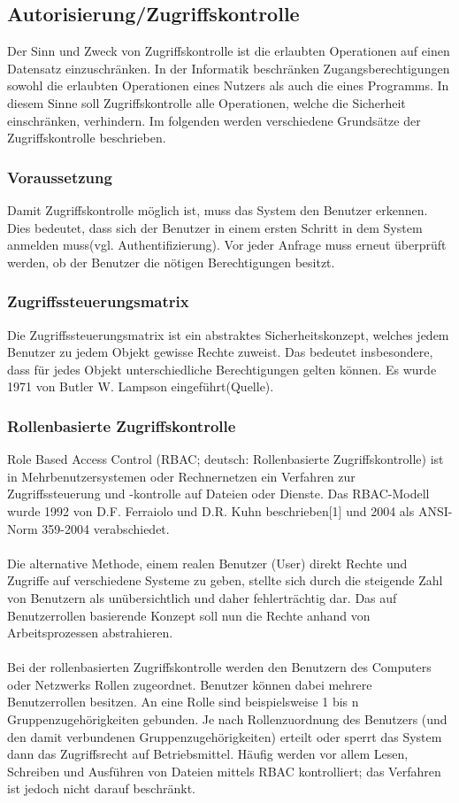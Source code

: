 \subsection*{Autorisierung/Zugriffskontrolle}

Der Sinn und Zweck von Zugriffskontrolle ist die erlaubten Operationen auf einen Datensatz einzuschränken. In der Informatik beschränken Zugangsberechtigungen sowohl die erlaubten Operationen eines Nutzers als auch die eines Programms. In diesem Sinne soll Zugriffskontrolle alle Operationen, welche die Sicherheit einschränken, verhindern. Im folgenden werden verschiedene Grundsätze der Zugriffskontrolle beschrieben.

\subsubsection{Voraussetzung}
Damit Zugriffskontrolle möglich ist, muss das System den Benutzer erkennen. Dies bedeutet, dass sich der Benutzer in einem ersten Schritt in dem System anmelden muss(vgl. Authentifizierung). Vor jeder Anfrage muss erneut überprüft werden, ob der Benutzer die nötigen Berechtigungen besitzt.
\subsubsection{Zugriffssteuerungsmatrix}
Die Zugriffssteuerungsmatrix ist ein abstraktes Sicherheitskonzept, welches jedem Benutzer zu jedem Objekt gewisse Rechte zuweist. Das bedeutet insbesondere, dass für jedes Objekt unterschiedliche Berechtigungen gelten können. Es wurde 1971 von Butler W. Lampson eingeführt(Quelle).
\subsubsection{Rollenbasierte Zugriffskontrolle}
Role Based Access Control (RBAC; deutsch: Rollenbasierte Zugriffskontrolle) ist in Mehrbenutzersystemen oder Rechnernetzen ein Verfahren zur Zugriffssteuerung und -kontrolle auf Dateien oder Dienste. Das RBAC-Modell wurde 1992 von D.F. Ferraiolo und D.R. Kuhn beschrieben[1] und 2004 als ANSI-Norm 359-2004 verabschiedet.
\\\\
Die alternative Methode, einem realen Benutzer (User) direkt Rechte und Zugriffe auf verschiedene Systeme zu geben, stellte sich durch die steigende Zahl von Benutzern als unübersichtlich und daher fehlerträchtig dar. Das auf Benutzerrollen basierende Konzept soll nun die Rechte anhand von Arbeitsprozessen abstrahieren.
\\\\
Bei der rollenbasierten Zugriffskontrolle werden den Benutzern des Computers oder Netzwerks Rollen zugeordnet. Benutzer können dabei mehrere Benutzerrollen besitzen. An eine Rolle sind beispielsweise 1 bis n Gruppenzugehörigkeiten gebunden. Je nach Rollenzuordnung des Benutzers (und den damit verbundenen Gruppenzugehörigkeiten) erteilt oder sperrt das System dann das Zugriffsrecht auf Betriebsmittel. Häufig werden vor allem Lesen, Schreiben und Ausführen von Dateien mittels RBAC kontrolliert; das Verfahren ist jedoch nicht darauf beschränkt.

